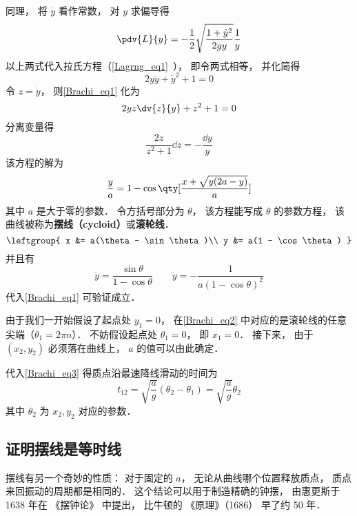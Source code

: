 同理， 将 $\dot y$ 看作常数， 对 $y$ 求偏导得
\begin{equation}
\pdv{L}{y} = -\frac{1}{2} \sqrt{\frac{1 + \dot{y}^2}{2gy}} \frac{1}{y}
\end{equation}
以上两式代入拉氏方程（\autoref{Lagrng_eq1}~）， 即令两式相等， 并化简得
\begin{equation}\label{Brachi_eq1}
2y\ddot y + \dot y^2 + 1 = 0
\end{equation}
令 $z=\dot{y}$， 则\autoref{Brachi_eq1} 化为
\begin{equation}
2yz\dv{z}{y}+z^2+1=0
\end{equation}
分离变量得
\begin{equation}
\frac{2z}{z^2+1}\dd z = -\frac{\dd y}{y}
\end{equation}
该方程的解为
\begin{equation}
\frac{y}{a} = 1 - \cos\qty[\frac{x + \sqrt{y(2a-y)}}{a}]
\end{equation}
其中 $a$ 是大于零的参数． 令方括号部分为 $\theta$， 该方程能写成 $\theta$ 的参数方程， 该曲线被称为\textbf{摆线（cycloid）}或\textbf{滚轮线}． %
\begin{equation}\label{Brachi_eq2}
\leftgroup{
x &= a(\theta - \sin\theta)\\
y &= a(1 - \cos\theta)
}\end{equation}
并且有
\begin{equation}
\dot y = \frac{\sin\theta}{1 - \cos\theta} \qquad
\ddot y = -\frac{1}{a(1-\cos\theta)^2}
\end{equation}
代入\autoref{Brachi_eq1} 可验证成立．

由于我们一开始假设了起点处 $y_1 = 0$， 在\autoref{Brachi_eq2} 中对应的是滚轮线的任意尖端（$\theta_1 = 2\pi n$）． 不妨假设起点处 $\theta_1 = 0$， 即 $x_1 = 0$． 接下来， 由于 $(x_2, y_2)$ 必须落在曲线上，  $a$ 的值可以由此确定．

代入\autoref{Brachi_eq3} 得质点沿最速降线滑动的时间为
\begin{equation}\label{Brachi_eq4}
t_{12} = \sqrt{\frac{a}{g}}(\theta_2 - \theta_1) = \sqrt{\frac{a}{g}} \theta_2
\end{equation}
其中 $\theta_2$ 为 $x_2, y_2$ 对应的参数．


\subsection{证明摆线是等时线}
摆线有另一个奇妙的性质： 对于固定的 $a$， 无论从曲线哪个位置释放质点， 质点来回振动的周期都是相同的． 这个结论可以用于制造精确的钟摆， 由惠更斯于 1638 年在 《摆钟论》 中提出， 比牛顿的 《原理》（1686） 早了约 50 年．

